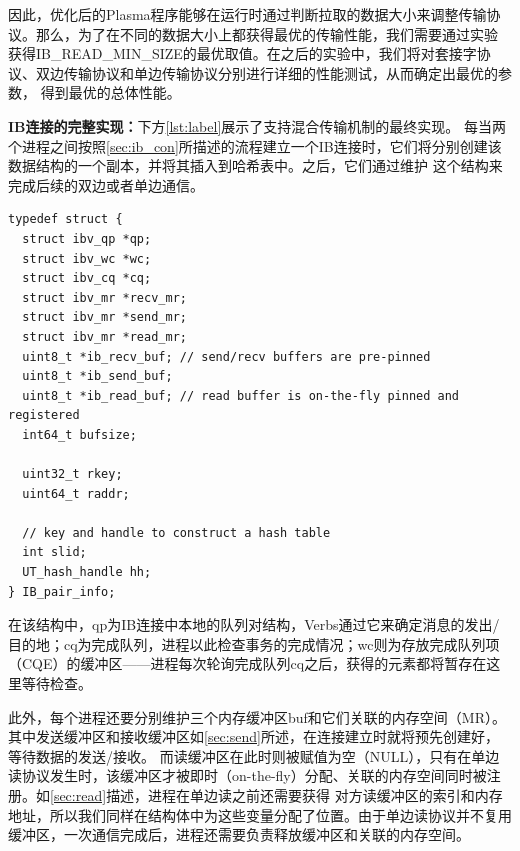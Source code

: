 因此，优化后的Plasma程序能够在运行时通过判断拉取的数据大小来调整传输协议。那么，为了在不同的数据大小上都获得最优的传输性能，我们需要通过实验
获得IB\_READ\_MIN\_SIZE的最优取值。在之后的实验中，我们将对套接字协议、双边传输协议和单边传输协议分别进行详细的性能测试，从而确定出最优的参数，
得到最优的总体性能。

\textbf{IB连接的完整实现：}下方\autoref{lst:label}展示了支持混合传输机制的最终实现。
每当两个进程之间按照\autoref{sec:ib_con}所描述的流程建立一个IB连接时，它们将分别创建该数据结构的一个副本，并将其插入到哈希表中。之后，它们通过维护
这个结构来完成后续的双边或者单边通信。

\begin{minipage}{\linewidth}	
\begin{lstlisting}[style=sysucpp, label={lst:label}]
typedef struct {
  struct ibv_qp *qp;
  struct ibv_wc *wc;
  struct ibv_cq *cq;
  struct ibv_mr *recv_mr;
  struct ibv_mr *send_mr;
  struct ibv_mr *read_mr;
  uint8_t *ib_recv_buf; // send/recv buffers are pre-pinned
  uint8_t *ib_send_buf;
  uint8_t *ib_read_buf; // read buffer is on-the-fly pinned and registered
  int64_t bufsize;

  uint32_t rkey;
  uint64_t raddr;

  // key and handle to construct a hash table
  int slid;
  UT_hash_handle hh;
} IB_pair_info;
\end{lstlisting}
\end{minipage}

在该结构中，qp为IB连接中本地的队列对结构，Verbs通过它来确定消息的发出/目的地；cq为完成队列，进程以此检查事务的完成情况；wc则为存放完成队列项（CQE）的缓冲区——进程每次轮询完成队列cq之后，获得的元素都将暂存在这里等待检查。

此外，每个进程还要分别维护三个内存缓冲区buf和它们关联的内存空间（MR）。其中发送缓冲区和接收缓冲区如\autoref{sec:send}所述，在连接建立时就将预先创建好，等待数据的发送/接收。
而读缓冲区在此时则被赋值为空（NULL），只有在单边读协议发生时，该缓冲区才被即时（on-the-fly）分配、关联的内存空间同时被注册。如\autoref{sec:read}描述，进程在单边读之前还需要获得
对方读缓冲区的索引和内存地址，所以我们同样在结构体中为这些变量分配了位置。由于单边读协议并不复用缓冲区，一次通信完成后，进程还需要负责释放缓冲区和关联的内存空间。